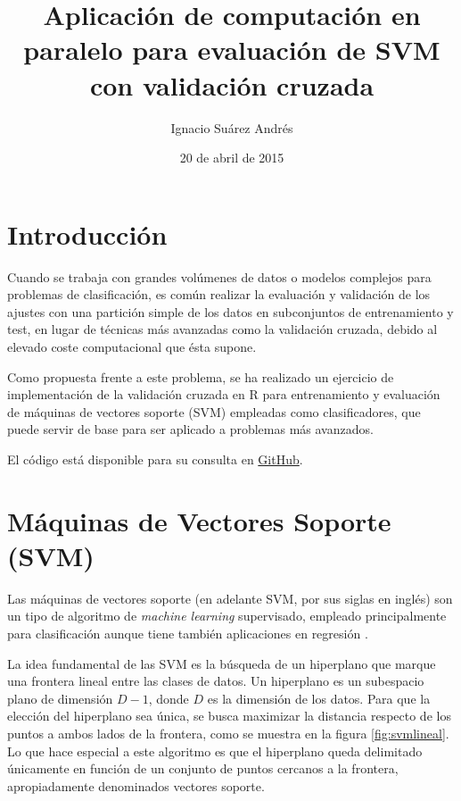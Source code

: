 \documentclass[12pt]{scrartcl}
\title{Aplicación de computación en paralelo para evaluación de SVM con validación cruzada}
\author{Ignacio Suárez Andrés}
\date{20 de abril de 2015}
\begin{document}

\maketitle
\section{Introducción}
Cuando se trabaja con grandes volúmenes de datos o modelos complejos para problemas de clasificación, es común realizar la evaluación y validación de los ajustes con una partición simple de los datos en subconjuntos de entrenamiento y test, en lugar de técnicas más avanzadas como la validación cruzada, debido al elevado coste computacional que ésta supone.\par
Como propuesta frente a este problema, se ha realizado un ejercicio de implementación de la validación cruzada en R \cite{Rcita} para entrenamiento y evaluación de máquinas de vectores soporte (SVM) empleadas como clasificadores, que puede servir de base para ser aplicado a problemas más avanzados.\par
El código está disponible para su consulta en \href{https://github.com/nachosandres/crossval-parallelization}{GitHub}.\par

\section{Máquinas de Vectores Soporte (SVM)}
Las máquinas de vectores soporte (en adelante SVM, por sus siglas en inglés) son un tipo de algoritmo de \textit{machine learning} supervisado, empleado principalmente para clasificación aunque tiene también aplicaciones en regresión \cite{islr}.\par
La idea fundamental de las SVM es la búsqueda de un hiperplano que marque una frontera lineal entre las clases de datos. Un hiperplano es un subespacio plano de dimensión $D-1$, donde $D$ es la dimensión de los datos. Para que la elección del hiperplano sea única, se busca maximizar la distancia respecto de los puntos a ambos lados de la frontera, como se muestra en la figura \ref{fig:svmlineal}. Lo que hace especial a este algoritmo es que el hiperplano queda delimitado únicamente en función de un conjunto de puntos cercanos a la frontera, apropiadamente denominados vectores soporte.\par
\end{document}
